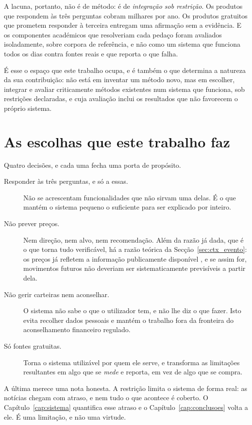 A lacuna, portanto, não é de método: é de \emph{integração sob restrição}. Os produtos que respondem
às três perguntas cobram milhares por ano. Os produtos gratuitos que prometem responder à terceira
entregam uma afirmação sem a evidência. E os componentes académicos que resolveriam cada pedaço
foram avaliados isoladamente, sobre corpora de referência, e não como um sistema que funciona todos
os dias contra fontes reais e que reporta o que falha.

É esse o espaço que este trabalho ocupa, e é também o que determina a natureza da sua contribuição:
não está em inventar um método novo, mas em escolher, integrar e avaliar criticamente métodos
existentes num sistema que funciona, sob restrições declaradas, e cuja avaliação inclui os
resultados que não favorecem o próprio sistema.

\section{As escolhas que este trabalho faz}
\label{sec:ctx_escolhas}

Quatro decisões, e cada uma fecha uma porta de propósito.

\begin{description}
  \item[Responder às três perguntas, e só a essas.] Não se acrescentam funcionalidades que não
        sirvam uma delas. É o que mantém o sistema pequeno o suficiente para ser explicado por
        inteiro.
  \item[Não prever preços.] Nem direção, nem alvo, nem recomendação. Além da razão já dada, que é o
        que torna tudo verificável, há a razão teórica da Secção~\ref{sec:ctx_evento}: os preços já
        refletem a informação publicamente disponível \autocite{fama1970efficient}, e se assim for,
        movimentos futuros não deveriam ser sistematicamente previsíveis a partir dela.
  \item[Não gerir carteiras nem aconselhar.] O sistema não sabe o que o utilizador tem, e não lhe diz
        o que fazer. Isto evita recolher dados pessoais e mantém o trabalho fora da fronteira do
        aconselhamento financeiro regulado.
  \item[Só fontes gratuitas.] Torna o sistema utilizável por quem ele serve, e transforma as
        limitações resultantes em algo que se \emph{mede} e reporta, em vez de algo que se compra.
\end{description}

A última merece uma nota honesta. A restrição limita o sistema de forma real: as notícias chegam
com atraso, e nem tudo o que acontece é coberto. O Capítulo~\ref{cap:sistema} quantifica esse
atraso e o Capítulo~\ref{cap:conclusoes} volta a ele. É uma limitação, e não uma virtude.
